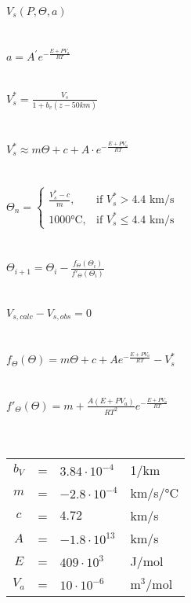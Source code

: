 \documentclass[]{scrartcl}
\begin{document}
\Huge

$V_s\left(P,\Theta,a\right)$
\\
\\
\\
$a=A^\prime e^{-\frac{E+PV_a}{RT}}$
\\
\\
\\
$V_s^*=\frac{V_s}{1+b_v(z-50km)}$
\\
\\
\\
$V_s^*\approx m\Theta + c + A\cdot e^{-\frac{E+PV_a}{RT}}$
\\
\\
\\
$
\Theta_n =
\begin{cases}
\frac{V_s^*-c}{m}, & \text{if }V_s^* > 4.4\text{ km/s} \\
1000\text{°C},     & \text{if }V_s^* \leq 4.4\text{ km/s}
\end{cases}
$
\\
\\
\\
$\Theta_{i+1} = \Theta_i - \frac{f_\Theta(\Theta_i)}{f'_\Theta(\Theta_i)}$
\\
\\
\\
$V_{s,calc}-V_{s,obs}=0$
\\
\\
\\
$f_\Theta(\Theta)=m\Theta + c + Ae^{-\frac{E+PV_a}{RT}}-V_s^*$
\\
\\
\\
$f'_\Theta(\Theta)=m+\frac{A(E+PV_a)}{RT^2}e^{-\frac{E+PV_a}{RT}}$
\\
\\
\\
\begin{tabular}{ccll}
$b_V$ &=& $3.84\cdot10^{-4}$ & 1/km \\
$m$   &=& $-2.8\cdot10^{-4}$ & km/s/°C \\
$c$   &=& $4.72$             & km/s \\
$A$   &=& $-1.8\cdot10^{13}$ & km/s \\
$E$   &=& $409\cdot10^3$     & J/mol \\
$V_a$ &=& $10\cdot10^{-6}$   & m$^3$/mol
\end{tabular}
\end{document}
